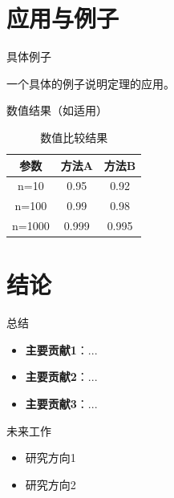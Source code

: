 \documentclass[aspectratio=169,11pt]{beamer}
\begin{document}
\section{应用与例子}

\begin{frame}{具体例子}
    \begin{example}
        一个具体的例子说明定理的应用。
    \end{example}

    \vspace{1em}

    \begin{center}
    \end{center}
\end{frame}

\begin{frame}{数值结果（如适用）}
    \begin{table}
        \centering
        \begin{tabular}{c|c|c}
            \hline
            参数 & 方法A & 方法B \\
            \hline
            n=10 & 0.95 & 0.92 \\
            n=100 & 0.99 & 0.98 \\
            n=1000 & 0.999 & 0.995 \\
            \hline
        \end{tabular}
        \caption{数值比较结果}
    \end{table}
\end{frame}

\section{结论}

\begin{frame}{总结}
    \begin{itemize}
        \item \textbf{主要贡献1}：...
        \item \textbf{主要贡献2}：...
        \item \textbf{主要贡献3}：...
    \end{itemize}

    \vspace{1em}

    \begin{block}{未来工作}
        \begin{itemize}
            \item 研究方向1
            \item 研究方向2
        \end{itemize}
    \end{block}
\end{frame}
\end{document}
